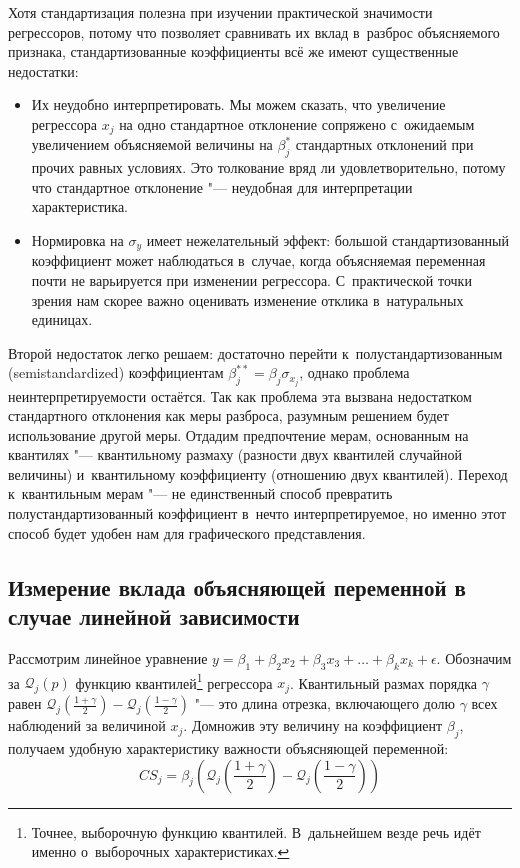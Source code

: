 \documentclass[11pt]{article}
\begin{document}
Хотя стандартизация полезна при изучении практической значимости регрессоров, потому что позволяет сравнивать их вклад в~разброс объясняемого признака, стандартизованные коэффициенты всё же имеют существенные недостатки:
\begin{itemize}
	\item Их неудобно интерпретировать. Мы можем сказать, что увеличение регрессора $x_j$ на одно стандартное отклонение сопряжено с~ожидаемым увеличением объясняемой величины на $\beta_j^*$ стандартных отклонений при прочих равных условиях.	Это толкование вряд ли удовлетворительно, потому что стандартное отклонение "--- неудобная для интерпретации характеристика.
	\item Нормировка на $\sigma_y$ имеет нежелательный эффект: большой стандартизованный коэффициент может наблюдаться в~случае, когда объясняемая переменная почти не варьируется при изменении регрессора. С~практической точки зрения нам скорее важно оценивать изменение отклика в~натуральных единицах.
\end{itemize}

Второй недостаток легко решаем: достаточно перейти к~полустандартизованным (semistandardized) коэффициентам $\beta_j^{**} = \beta_j\sigma_{x_j}$, однако проблема неинтерпретируемости остаётся. Так как проблема эта вызвана недостатком стандартного отклонения как меры разброса, разумным решением будет использование другой меры. Отдадим предпочтение мерам, основанным на квантилях "--- квантильному размаху (разности двух квантилей случайной величины) и~квантильному коэффициенту (отношению двух квантилей). Переход к~квантильным мерам "--- не единственный способ превратить полустандартизованный коэффициент в~нечто интерпретируемое, но именно этот способ будет удобен нам для графического представления.

\subsection*{Измерение вклада объясняющей переменной в случае линейной зависимости}

Рассмотрим линейное уравнение $y = \beta_1 + \beta_2x_2 + \beta_3x_3 + \ldots + \beta_kx_k + \epsilon$.
Обозначим за $\mathcal{Q}_j(p)$ функцию квантилей\footnote{Точнее, выборочную функцию квантилей. В~дальнейшем везде речь идёт именно о~выборочных характеристиках.} регрессора $x_j$. Квантильный размах порядка $\gamma$ равен $\mathcal{Q}_j\left(\frac{1+\gamma}{2}\right)-\mathcal{Q}_j\left(\frac{1-\gamma}{2}\right)$ "--- это длина отрезка, включающего долю $\gamma$ всех наблюдений за величиной $x_j$. Домножив эту величину на коэффициент $\beta_j$, получаем удобную характеристику важности объясняющей переменной:
\[CS_j = \beta_j\left(\mathcal{Q}_j\left(\frac{1+\gamma}{2}\right)-\mathcal{Q}_j\left(\frac{1-\gamma}{2}\right)\right)\]
\end{document}
